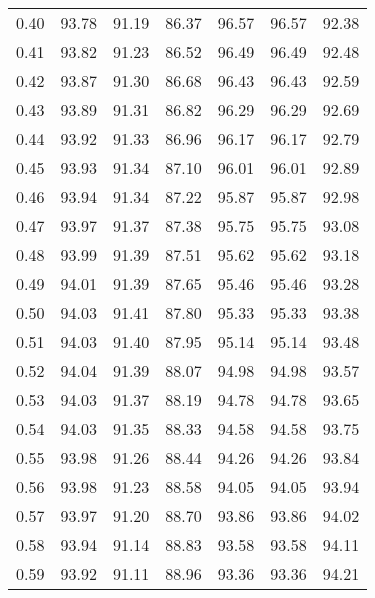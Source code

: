 \begin{tabular}{|c|c|c|c|c|c|c|}
      0.40 &     93.78 &     91.19 &      86.37 &   96.57 &      96.57 &         92.38 \\
      0.41 &     93.82 &     91.23 &      86.52 &   96.49 &      96.49 &         92.48 \\
      0.42 &     93.87 &     91.30 &      86.68 &   96.43 &      96.43 &         92.59 \\
      0.43 &     93.89 &     91.31 &      86.82 &   96.29 &      96.29 &         92.69 \\
      0.44 &     93.92 &     91.33 &      86.96 &   96.17 &      96.17 &         92.79 \\
      0.45 &     93.93 &     91.34 &      87.10 &   96.01 &      96.01 &         92.89 \\
      0.46 &     93.94 &     91.34 &      87.22 &   95.87 &      95.87 &         92.98 \\
      0.47 &     93.97 &     91.37 &      87.38 &   95.75 &      95.75 &         93.08 \\
      0.48 &     93.99 &     91.39 &      87.51 &   95.62 &      95.62 &         93.18 \\
      0.49 &     94.01 &     91.39 &      87.65 &   95.46 &      95.46 &         93.28 \\
      0.50 &     94.03 &     91.41 &      87.80 &   95.33 &      95.33 &         93.38 \\
      0.51 &     94.03 &     91.40 &      87.95 &   95.14 &      95.14 &         93.48 \\
      0.52 &     94.04 &     91.39 &      88.07 &   94.98 &      94.98 &         93.57 \\
      0.53 &     94.03 &     91.37 &      88.19 &   94.78 &      94.78 &         93.65 \\
      0.54 &     94.03 &     91.35 &      88.33 &   94.58 &      94.58 &         93.75 \\
      0.55 &     93.98 &     91.26 &      88.44 &   94.26 &      94.26 &         93.84 \\
      0.56 &     93.98 &     91.23 &      88.58 &   94.05 &      94.05 &         93.94 \\
      0.57 &     93.97 &     91.20 &      88.70 &   93.86 &      93.86 &         94.02 \\
      0.58 &     93.94 &     91.14 &      88.83 &   93.58 &      93.58 &         94.11 \\
      0.59 &     93.92 &     91.11 &      88.96 &   93.36 &      93.36 &         94.21 \\

\end{tabular}
